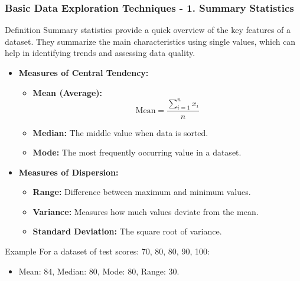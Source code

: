 \documentclass[aspectratio=169]{beamer}
\begin{document}
\begin{frame}[fragile]
    \frametitle{Basic Data Exploration Techniques - 1. Summary Statistics}
    \begin{block}{Definition}
        Summary statistics provide a quick overview of the key features of a dataset. They summarize the main characteristics using single values, which can help in identifying trends and assessing data quality.
    \end{block}
    
    \begin{itemize}
        \item \textbf{Measures of Central Tendency:}
        \begin{itemize}
            \item \textbf{Mean (Average):} 
            \begin{equation}
                \text{Mean} = \frac{\sum_{i=1}^{n} x_i}{n}
            \end{equation}
            \item \textbf{Median:} The middle value when data is sorted.
            \item \textbf{Mode:} The most frequently occurring value in a dataset.
        \end{itemize}
        
        \item \textbf{Measures of Dispersion:}
        \begin{itemize}
            \item \textbf{Range:} Difference between maximum and minimum values.
            \item \textbf{Variance:} Measures how much values deviate from the mean.
            \item \textbf{Standard Deviation:} The square root of variance.
        \end{itemize}
    \end{itemize}
    
    \begin{block}{Example}
        For a dataset of test scores: 70, 80, 80, 90, 100:
        \begin{itemize}
            \item Mean: $84$, Median: $80$, Mode: $80$, Range: $30$.
        \end{itemize}
    \end{block}
\end{frame}
\end{document}
